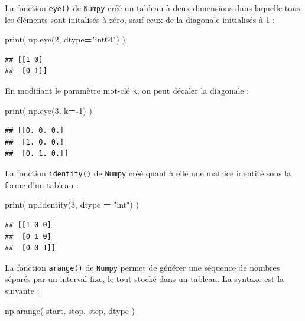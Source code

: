 \documentclass[12pt,]{book}
\newenvironment{Shaded}{\begin{snugshade}}{\end{snugshade}}
\newcommand{\DecValTok}[1]{\textcolor[rgb]{0.00,0.00,0.81}{#1}}
\newcommand{\StringTok}[1]{\textcolor[rgb]{0.31,0.60,0.02}{#1}}
\newcommand{\OperatorTok}[1]{\textcolor[rgb]{0.81,0.36,0.00}{\textbf{#1}}}
\newcommand{\BuiltInTok}[1]{#1}
\newcommand{\NormalTok}[1]{#1}
\numberwithin{equation}{section}
\numberwithin{countremarque}{section}
\begin{document}
La fonction \texttt{eye()} de \texttt{Numpy} créé un tableau à deux
dimensions dans laquelle tous les éléments sont initalisés à zéro, sauf
ceux de la diagonale initialisés à 1 :

\begin{Shaded}
\begin{Highlighting}[]
\BuiltInTok{print}\NormalTok{( np.eye(}\DecValTok{2}\NormalTok{, dtype}\OperatorTok{=}\StringTok{"int64"}\NormalTok{) )}
\end{Highlighting}
\end{Shaded}

\begin{lstlisting}
## [[1 0]
##  [0 1]]
\end{lstlisting}

En modifiant le paramètre mot-clé \texttt{k}, on peut décaler la
diagonale :

\begin{Shaded}
\begin{Highlighting}[]
\BuiltInTok{print}\NormalTok{( np.eye(}\DecValTok{3}\NormalTok{, k}\OperatorTok{=-}\DecValTok{1}\NormalTok{) )}
\end{Highlighting}
\end{Shaded}

\begin{lstlisting}
## [[0. 0. 0.]
##  [1. 0. 0.]
##  [0. 1. 0.]]
\end{lstlisting}

La fonction \texttt{identity()} de \texttt{Numpy} créé quant à elle une
matrice identité sous la forme d'un tableau :

\begin{Shaded}
\begin{Highlighting}[]
\BuiltInTok{print}\NormalTok{( np.identity(}\DecValTok{3}\NormalTok{, dtype }\OperatorTok{=} \StringTok{"int"}\NormalTok{) )}
\end{Highlighting}
\end{Shaded}

\begin{lstlisting}
## [[1 0 0]
##  [0 1 0]
##  [0 0 1]]
\end{lstlisting}

La fonction \texttt{arange()} de \texttt{Numpy} permet de générer une
séquence de nombres séparés par un interval fixe, le tout stocké dans un
tableau. La syntaxe est la suivante :

\begin{Shaded}
\begin{Highlighting}[]
\NormalTok{np.arange( start, stop, step, dtype )}
\end{Highlighting}
\end{Shaded}
\end{document}
